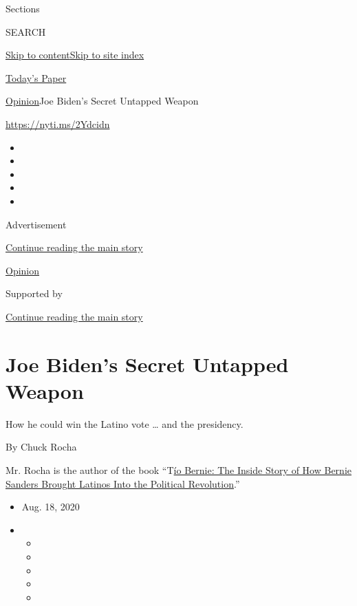 Sections

SEARCH

\protect\hyperlink{site-content}{Skip to
content}\protect\hyperlink{site-index}{Skip to site index}

\href{https://myaccount.nytimes3xbfgragh.onion/auth/login?response_type=cookie\&client_id=vi}{}

\href{https://www.nytimes3xbfgragh.onion/section/todayspaper}{Today's
Paper}

\href{/section/opinion}{Opinion}\textbar{}Joe Biden's Secret Untapped
Weapon

\url{https://nyti.ms/2Ydcidn}

\begin{itemize}
\item
\item
\item
\item
\item
\end{itemize}

Advertisement

\protect\hyperlink{after-top}{Continue reading the main story}

\href{/section/opinion}{Opinion}

Supported by

\protect\hyperlink{after-sponsor}{Continue reading the main story}

\hypertarget{joe-bidens-secret-untapped-weapon}{%
\section{Joe Biden's Secret Untapped
Weapon}\label{joe-bidens-secret-untapped-weapon}}

How he could win the Latino vote \ldots{} and the presidency.

By Chuck Rocha

Mr. Rocha is the author of the book
``T\href{https://strongarmpress.com/catalog/tio-bernie/}{ío Bernie: The
Inside Story of How Bernie Sanders Brought Latinos Into the Political
Revolution}.''

\begin{itemize}
\item
  Aug. 18, 2020
\item
  \begin{itemize}
  \item
  \item
  \item
  \item
  \item
  \end{itemize}
\end{itemize}

